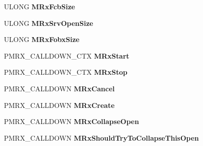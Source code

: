 \begin{DoxyCompactItemize}
U\+L\+O\+NG {\bfseries M\+Rx\+Fcb\+Size}
\item 
\mbox{\label{struct___m_i_n_i_r_d_r___d_i_s_p_a_t_c_h_a2f59c427ff52276fef0698d432b1e31d}} 
U\+L\+O\+NG {\bfseries M\+Rx\+Srv\+Open\+Size}
\item 
\mbox{\label{struct___m_i_n_i_r_d_r___d_i_s_p_a_t_c_h_ad8645a243712f2ae8bb9b92a193bb800}} 
U\+L\+O\+NG {\bfseries M\+Rx\+Fobx\+Size}
\item 
\mbox{\label{struct___m_i_n_i_r_d_r___d_i_s_p_a_t_c_h_abef2062bb1249358fd42302bd9e30847}} 
P\+M\+R\+X\+\_\+\+C\+A\+L\+L\+D\+O\+W\+N\+\_\+\+C\+TX {\bfseries M\+Rx\+Start}
\item 
\mbox{\label{struct___m_i_n_i_r_d_r___d_i_s_p_a_t_c_h_ae16d0f8e291c9afc21ba1259b441bc7a}} 
P\+M\+R\+X\+\_\+\+C\+A\+L\+L\+D\+O\+W\+N\+\_\+\+C\+TX {\bfseries M\+Rx\+Stop}
\item 
\mbox{\label{struct___m_i_n_i_r_d_r___d_i_s_p_a_t_c_h_a9da320199acee9aa4f81a2440244d236}} 
P\+M\+R\+X\+\_\+\+C\+A\+L\+L\+D\+O\+WN {\bfseries M\+Rx\+Cancel}
\item 
\mbox{\label{struct___m_i_n_i_r_d_r___d_i_s_p_a_t_c_h_ad237eb8b7df3373931b2a159d31d8e3b}} 
P\+M\+R\+X\+\_\+\+C\+A\+L\+L\+D\+O\+WN {\bfseries M\+Rx\+Create}
\item 
\mbox{\label{struct___m_i_n_i_r_d_r___d_i_s_p_a_t_c_h_a6b944946d2fa462cb6be984fa1d9fd40}} 
P\+M\+R\+X\+\_\+\+C\+A\+L\+L\+D\+O\+WN {\bfseries M\+Rx\+Collapse\+Open}
\item 
\mbox{\label{struct___m_i_n_i_r_d_r___d_i_s_p_a_t_c_h_ad46625b4b91114b51cfcf006a10b307e}} 
P\+M\+R\+X\+\_\+\+C\+A\+L\+L\+D\+O\+WN {\bfseries M\+Rx\+Should\+Try\+To\+Collapse\+This\+Open}
\item 
\mbox{\label{struct___m_i_n_i_r_d_r___d_i_s_p_a_t_c_h_a9d7b06062e93a34a1a003334a840796e}} 

\end{DoxyCompactItemize}
